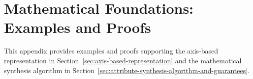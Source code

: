 \section{Mathematical Foundations: Examples and Proofs}
\label{app:mathematical-foundations}
This appendix provides examples and proofs supporting the axis-based
representation in Section~\ref{sec:axis-based-representation} and the mathematical
synthesis algorithm in Section~\ref{sec:attribute-synthesis-algorithm-and-guarantees}.


\FloatBarrier


\FloatBarrier

\FloatBarrier

\FloatBarrier

\FloatBarrier
